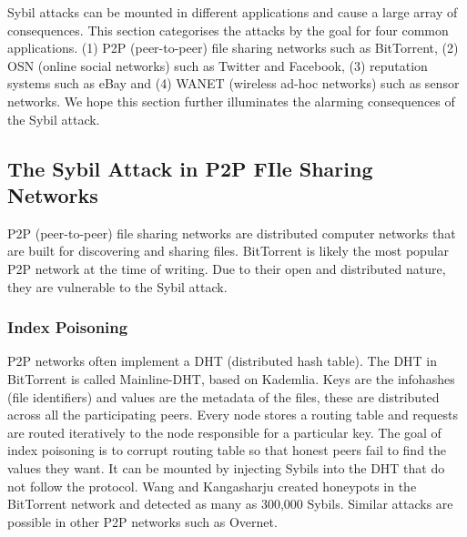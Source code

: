 
Sybil attacks can be mounted in different applications and cause a large array
of consequences. This section categorises the attacks by the goal for four
common applications. (1) P2P (peer-to-peer) file sharing networks such as
BitTorrent, (2) OSN (online social networks) such as Twitter and Facebook, (3)
reputation systems such as eBay and (4) WANET (wireless ad-hoc networks) such as
sensor networks. We hope this section further illuminates the alarming
consequences of the Sybil attack.

\subsection{The Sybil Attack in P2P FIle Sharing Networks}
P2P (peer-to-peer) file sharing networks are distributed computer networks that
are built for discovering and sharing files. BitTorrent\cite{bep3} is likely the
most popular P2P network at the time of writing. Due to their open and
distributed nature, they are vulnerable to the Sybil attack.

\subsubsection{Index Poisoning}
P2P networks often implement a DHT (distributed hash table). The DHT in
BitTorrent is called Mainline-DHT, based on
Kademlia\cite{maymounkov2002kademlia}. Keys are the infohashes (file
identifiers) and values are the metadata of the files, these are distributed
across all the participating peers. Every node stores a routing table and
requests are routed iteratively to the node responsible for a particular
key\cite{bep5}. The goal of index poisoning is to corrupt routing table so that
honest peers fail to find the values they want. It can be mounted by injecting
Sybils into the DHT that do not follow the protocol. Wang and Kangasharju
created honeypots in the BitTorrent network and detected as many as 300,000
Sybils\cite{wang2012real}. Similar attacks are possible in other P2P networks
such as Overnet\cite{liang2006index}.



